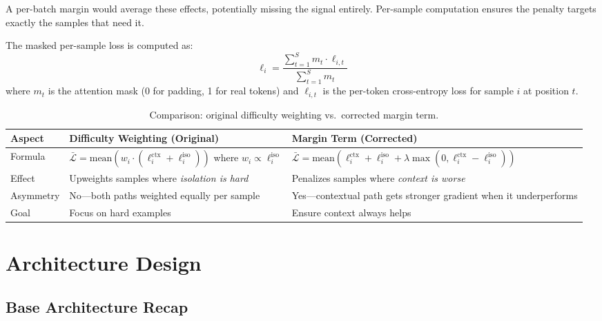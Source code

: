 \documentclass[11pt, a4paper]{report}
\begin{document}
A per-batch margin would average these effects, potentially missing the signal entirely. Per-sample computation ensures the penalty targets exactly the samples that need it.

The masked per-sample loss is computed as:
\begin{equation}
  \ell_i = \frac{\sum_{t=1}^{S} m_t \cdot \ell_{i,t}}{\sum_{t=1}^{S} m_t}
\end{equation}
where $m_t$ is the attention mask (0 for padding, 1 for real tokens) and $\ell_{i,t}$ is the per-token cross-entropy loss for sample $i$ at position $t$.

\begin{table}[t]
\centering
\caption{Comparison: original difficulty weighting vs.\ corrected margin term.}
\label{tab:loss-comparison}
\begin{tabularx}{\textwidth}{lXX}
\toprule
\textbf{Aspect} & \textbf{Difficulty Weighting (Original)} & \textbf{Margin Term (Corrected)} \\
\midrule
Formula & $\bar{\mathcal{L}} = \mathrm{mean}(w_i \cdot (\ell_i^{\mathrm{ctx}} + \ell_i^{\mathrm{iso}}))$ where $w_i \propto \ell_i^{\mathrm{iso}}$ & $\bar{\mathcal{L}} = \mathrm{mean}(\ell_i^{\mathrm{ctx}} + \ell_i^{\mathrm{iso}} + \lambda \max(0, \ell_i^{\mathrm{ctx}} - \ell_i^{\mathrm{iso}}))$ \\
\addlinespace
Effect & Upweights samples where \emph{isolation is hard} & Penalizes samples where \emph{context is worse} \\
\addlinespace
Asymmetry & No---both paths weighted equally per sample & Yes---contextual path gets stronger gradient when it underperforms \\
\addlinespace
Goal & Focus on hard examples & Ensure context always helps \\
\bottomrule
\end{tabularx}
\end{table}


\chapter{Architecture Design}
\label{ch:architecture}

\section{Base Architecture Recap}
\label{sec:base-arch}
\end{document}
